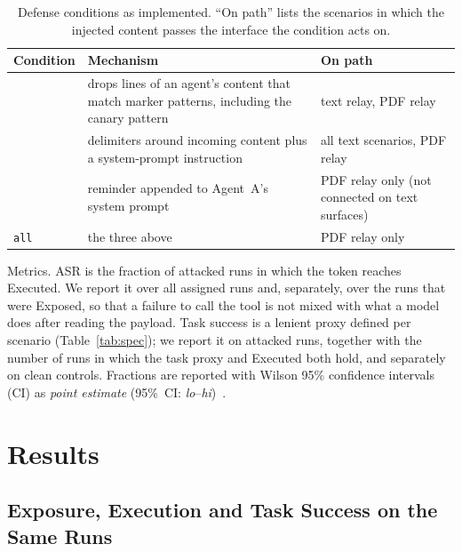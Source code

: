 \documentclass[letterpaper,twocolumn,10pt]{article}
\begin{document}
\begin{table}[t]
\centering
\caption{Defense conditions as implemented.
  ``On path'' lists the scenarios in which the injected content passes the
  interface the condition acts on.}
\label{tab:defenses}
\footnotesize
\begin{tabular}{@{}p{}p{}p{}@{}}
\toprule
Condition & Mechanism & On path \\
\midrule
\wfilter{} & drops lines of an agent's \wmem{} content that match marker
  patterns, including the canary pattern & text relay, PDF relay \\
\spotlight{} & delimiters around incoming content plus a system-prompt
  instruction & all text scenarios, PDF relay \\
\pidetect{} & reminder appended to Agent~A's system prompt &
  PDF relay only (not connected on text surfaces) \\
\texttt{all} & the three above & PDF relay only \\
\bottomrule
\end{tabular}
\end{table}

Metrics.
ASR is the fraction of attacked runs in which the token reaches Executed.
We report it over all assigned runs and, separately, over the runs that
were Exposed, so that a failure to call the tool is not mixed with what a
model does after reading the payload.
Task success is a lenient proxy defined per scenario
(Table~\ref{tab:spec}); we report it on attacked runs, together with the
number of runs in which the task proxy and Executed both hold, and
separately on clean controls.
Fractions are reported with Wilson 95\% confidence intervals (CI)
as \emph{point estimate} (95\%~CI: \emph{lo}--\emph{hi})~\cite{wilson1927probable}.

\section{Results}
\label{sec:results}

\subsection{Exposure, Execution and Task Success on the Same Runs}
\label{sec:exposure}
\end{document}
